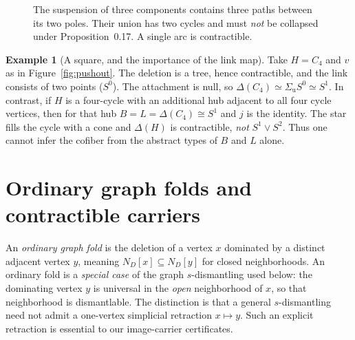 \documentclass[11pt,letterpaper]{article}
\theoremstyle{definition}
\newtheorem{example}[theorem]{Example}
\theoremstyle{remark}
\newcommand{\Del}{\Delta}
\newcommand{\SigmaU}{\Sigma_{\mathrm u}}
\newcommand{\N}{N}
\begin{document}
\begin{figure}[htbp]
\centering
{}
\caption{The suspension of three components contains three paths
between its two poles. Their union has two cycles and must \emph{not}
be collapsed under Proposition~0.17. A single arc is contractible.}
\label{fig:suspension-arcs}
\end{figure}

\begin{example}[A square, and the importance of the link map]\label{ex:square}
Take \(H=C_4\) and \(v\) as in Figure~\ref{fig:pushout}. The deletion is a tree, hence contractible, and the link consists of two points (\(S^0\)). The attachment is null, so \(\Del(C_4)\simeq\SigmaU S^0\simeq S^1\). In contrast, if \(H\) is a four-cycle with an additional hub adjacent to all four cycle vertices, then for that hub \(B=L=\Del(C_4)\cong S^1\) and \(j\) is the identity. The star fills the cycle with a cone and \(\Del(H)\) is contractible, \emph{not} \(S^1\vee S^2\). Thus one cannot infer the cofiber from the abstract types of \(B\) and \(L\) alone.
\end{example}

\section{Ordinary graph folds and contractible carriers}
An \emph{ordinary graph fold} is the deletion of a vertex \(x\) dominated by a distinct adjacent vertex \(y\), meaning \(\N_D[x]\subseteq\N_D[y]\) for closed neighborhoods. An ordinary fold is a \emph{special case} of the graph \(s\)-dismantling used below: the dominating vertex \(y\) is universal in the \emph{open} neighborhood of \(x\), so that neighborhood is dismantlable. The distinction is that a general \(s\)-dismantling need not admit a one-vertex simplicial retraction \(x\mapsto y\). Such an explicit retraction is essential to our image-carrier certificates.
\end{document}
